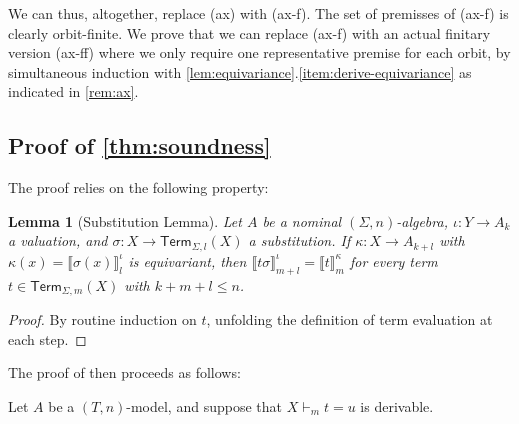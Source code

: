 \documentclass[11pt,a4paper]{amsart}
\newtheorem{lemma}[lemma]{Lemma}
\newcommand{\Term}{\mathsf{Term}}
\theoremstyle{plain}
\numberwithin{equation}{section}
\newcommand{\+}[1]{\mathcal{#1}\xspace}
\theoremstyle{definition}
\begin{document}
We can thus, altogether, replace (ax) with (ax-f). The set of
premisses of (ax-f) is clearly orbit-finite. We prove that we can
replace (ax-f) with an actual finitary version (ax-ff) where we only
require one representative premise for each orbit, by simultaneous
induction with
\cref{lem:equivariance}.\eqref{item:derive-equivariance} as
indicated in \cref{rem:ax}.

\subsection*{Proof of \cref{thm:soundness}}
The proof relies on the following property:
\begin{lemma}[Substitution Lemma]\label{thm:substitutionlemma}
    Let \(A\) be a nominal \((\Sigma, n)\)-algebra, \(\iota: Y \to A_k\) a valuation, and \(\sigma: X \to \Term_{\Sigma, l}(X)\) a substitution.
    If \(\kappa: X \to A_{k + l}\) with \(\kappa(x) = \llbracket \sigma(x) \rrbracket^\iota_l\) is equivariant, then \(\llbracket t\sigma \rrbracket^\iota_{m + l} = \llbracket t \rrbracket^\kappa_m\) for every term \(t \in \Term_{\Sigma, m}(X)\) with \(k + m + l \le n\).
\end{lemma}
\begin{proof}
  By routine induction on $t$, unfolding the definition of term
  evaluation at each step.
\end{proof}

The proof of  then proceeds as follows:

Let \(A\) be a \((T, n)\)-model, and suppose that \(X \vdash_m t = u\) is derivable.
\end{document}
